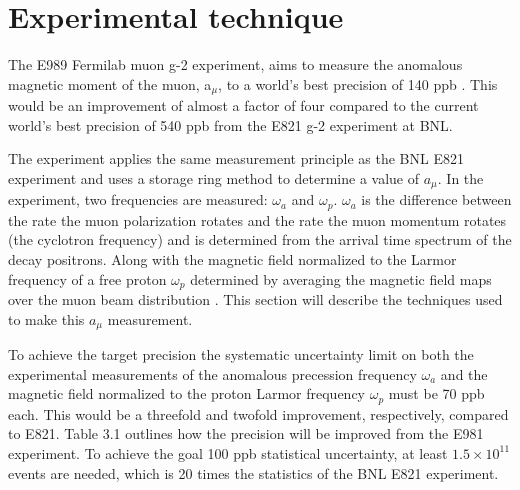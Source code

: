 
\chapter{Experimental technique} %

\label{Chapter2} %

The E989 Fermilab muon g-2 experiment, aims to measure the anomalous magnetic moment of the muon, a$_{\mu}$, to a world’s best precision of 140 ppb \cite{Reference13}. This would be an improvement of almost a factor of four compared to the current world's best precision of 540 ppb from the E821 g-2 experiment at BNL.

The experiment applies the same measurement principle as the BNL E821 experiment and uses a storage ring method to determine a value of $a_{\mu}$. In the experiment, two frequencies are measured: $\omega_a$ and $\omega_p$. $\omega_a$ is the difference between the rate the muon polarization rotates and the rate the muon momentum rotates (the cyclotron frequency) and is determined from the arrival time spectrum of the decay positrons. Along with the magnetic field normalized to the Larmor frequency of a free proton $\omega_{p}$ determined by averaging the magnetic field maps over the muon beam distribution \cite{Reference23}. This section will describe the techniques used to make this $a_{\mu}$ measurement. 

To achieve the target precision the systematic uncertainty limit on both the experimental measurements of the anomalous precession frequency $\omega_{a}$ and the magnetic field normalized to the proton Larmor frequency $\omega_{p}$ must be 70 ppb each. This would be a threefold and twofold improvement, respectively, compared to E821. Table 3.1 outlines how the precision will be improved from the E981 experiment. To achieve the goal 100 ppb statistical uncertainty, at least $1.5\times{10^{11}}$ events are needed, which is 20 times the statistics of the BNL E821 experiment.  


